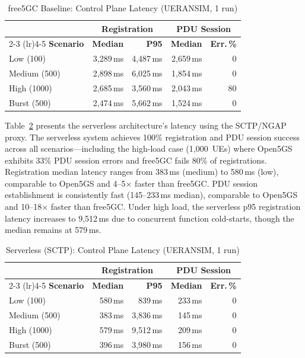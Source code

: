 \documentclass[conference]{IEEEtran}
\begin{document}
\begin{table}[t]
\centering
\caption{free5GC Baseline: Control Plane Latency (UERANSIM, 1 run)}
\label{tab:free5gc-latency}
\footnotesize
\begin{tabular}{@{}lrrrr@{}}
\toprule
 & \multicolumn{2}{c}{\textbf{Registration}} & \multicolumn{2}{c}{\textbf{PDU Session}} \\
\cmidrule(lr){2-3} \cmidrule(lr){4-5}
\textbf{Scenario} & \textbf{Median} & \textbf{P95} & \textbf{Median} & \textbf{Err.\,\%} \\
\midrule
Low (100)    & 3,289\,ms & 4,487\,ms  & 2,659\,ms & 0  \\
Medium (500) & 2,898\,ms & 6,025\,ms  & 1,854\,ms & 0  \\
High (1000)  & 2,685\,ms & 3,560\,ms  & 2,043\,ms & 80 \\
Burst (500)  & 2,474\,ms & 5,662\,ms  & 1,524\,ms & 0  \\
\bottomrule
\end{tabular}
\end{table}

Table~\ref{tab:serverless-latency} presents the serverless architecture's latency using the SCTP/NGAP proxy. The serverless system achieves 100\% registration and PDU session success across all scenarios---including the high-load case (1,000~UEs) where Open5GS exhibits 33\% PDU session errors and free5GC fails 80\% of registrations. Registration median latency ranges from 383\,ms (medium) to 580\,ms (low), comparable to Open5GS and 4--5$\times$ faster than free5GC. PDU session establishment is consistently fast (145--233\,ms median), comparable to Open5GS and 10--18$\times$ faster than free5GC. Under high load, the serverless p95 registration latency increases to 9,512\,ms due to concurrent function cold-starts, though the median remains at 579\,ms.

\begin{table}[t]
\centering
\caption{Serverless (SCTP): Control Plane Latency (UERANSIM, 1 run)}
\label{tab:serverless-latency}
\footnotesize
\begin{tabular}{@{}lrrrr@{}}
\toprule
 & \multicolumn{2}{c}{\textbf{Registration}} & \multicolumn{2}{c}{\textbf{PDU Session}} \\
\cmidrule(lr){2-3} \cmidrule(lr){4-5}
\textbf{Scenario} & \textbf{Median} & \textbf{P95} & \textbf{Median} & \textbf{Err.\,\%} \\
\midrule
Low (100)    & 580\,ms  & 839\,ms    & 233\,ms  & 0  \\
Medium (500) & 383\,ms  & 3,836\,ms  & 145\,ms  & 0  \\
High (1000)  & 579\,ms  & 9,512\,ms  & 209\,ms  & 0  \\
Burst (500)  & 396\,ms  & 3,980\,ms  & 156\,ms  & 0  \\
\bottomrule
\end{tabular}
\end{table}
\end{document}
